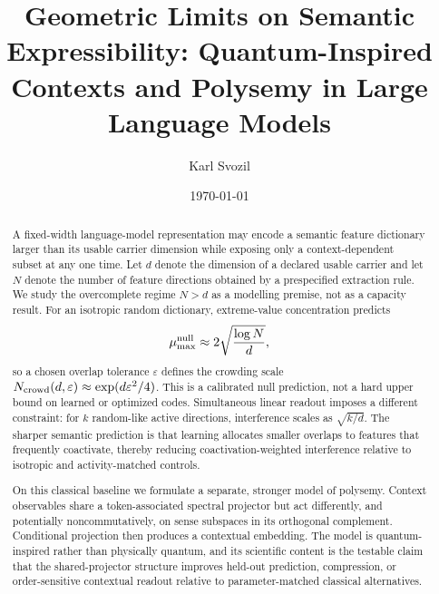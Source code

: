 \documentclass[
  aps,
  reprint,
  superscriptaddress,
  floatfix,
  nofootinbib,
  longbibliography
]{revtex4-2}
\newcommand{\Nsem}{N}
\begin{document}
\title{Geometric Limits on Semantic Expressibility: Quantum-Inspired Contexts and Polysemy in Large Language Models}

\author{Karl Svozil}

\date{\today}

\begin{abstract}
A fixed-width language-model representation may encode a semantic feature
dictionary larger than its usable carrier dimension while exposing only a
context-dependent subset at any one time.  Let $d$ denote the dimension of a
declared usable carrier and let $\Nsem$ denote the number of feature directions
obtained by a prespecified extraction rule.  We study the overcomplete regime
$\Nsem>d$ as a modelling premise, not as a capacity result.  For an isotropic
random dictionary, extreme-value concentration predicts
\[
 \mu_{\max}^{\rm null}
 \approx 2\sqrt{\frac{\log \Nsem}{d}},
\]
so a chosen overlap tolerance $\varepsilon$ defines the crowding scale
$N_{\rm crowd}(d,\varepsilon)\approx\exp(d\varepsilon^2/4)$.  This is a
calibrated null prediction, not a hard upper bound on learned or optimized
codes.  Simultaneous linear readout imposes a different constraint: for $k$
random-like active directions, interference scales as $\sqrt{k/d}$.  The
sharper semantic prediction is that learning allocates smaller overlaps to
features that frequently coactivate, thereby reducing coactivation-weighted
interference relative to isotropic and activity-matched controls.

On this classical baseline we formulate a separate, stronger model of
polysemy.  Context observables share a token-associated spectral projector but
act differently, and potentially noncommutatively, on sense subspaces in its
orthogonal complement.  Conditional projection then produces a contextual
embedding.  The model is quantum-inspired rather than physically quantum, and
its scientific content is the testable claim that the shared-projector
structure improves held-out prediction, compression, or order-sensitive
contextual readout relative to parameter-matched classical alternatives.
\end{abstract}

\maketitle


\end{document}

